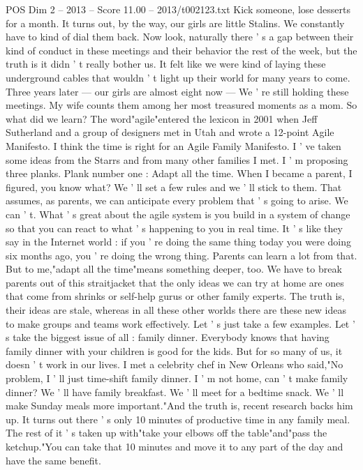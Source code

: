 \begin{textsample}{POS Dim 2 – 2013 – Score 11.00 – 2013/t002123.txt}
Kick someone, lose desserts for a month.
It turns out, by the way, our girls are little Stalins.
We constantly have to kind of dial them back.
Now look, naturally there ' s a gap between their kind of conduct in these meetings and their behavior the rest of the week, but the truth is it didn ' t really bother us.
It felt like we were kind of laying these underground cables that wouldn ' t light up their world for many years to come.
Three years later — our girls are almost eight now — We ' re still holding these meetings.
My wife counts them among her most treasured moments as a mom.
So what did we learn?
The word"agile"entered the lexicon in 2001 when Jeff Sutherland and a group of designers met in Utah and wrote a 12-point Agile Manifesto.
I think the time is right for an Agile Family Manifesto.
I ' ve taken some ideas from the Starrs and from many other families I met.
I ' m proposing three planks.
Plank number one : Adapt all the time.
When I became a parent, I figured, you know what?
We ' ll set a few rules and we ' ll stick to them.
That assumes, as parents, we can anticipate every problem that ' s going to arise.
We can ' t.
What ' s great about the agile system is you build in a system of change so that you can react to what ' s happening to you in real time.
It ' s like they say in the Internet world : if you ' re doing the same thing today you were doing six months ago, you ' re doing the wrong thing.
Parents can learn a lot from that.
But to me,"adapt all the time"means something deeper, too.
We have to break parents out of this straitjacket that the only ideas we can try at home are ones that come from shrinks or self-help gurus or other family experts.
The truth is, their ideas are stale, whereas in all these other worlds there are these new ideas to make groups and teams work effectively.
Let ' s just take a few examples.
Let ' s take the biggest issue of all : family dinner.
Everybody knows that having family dinner with your children is good for the kids.
But for so many of us, it doesn ' t work in our lives.
I met a celebrity chef in New Orleans who said,"No problem, I ' ll just time-shift family dinner.
I ' m not home, can ' t make family dinner?
We ' ll have family breakfast.
We ' ll meet for a bedtime snack.
We ' ll make Sunday meals more important."And the truth is, recent research backs him up.
It turns out there ' s only 10 minutes of productive time in any family meal.
The rest of it ' s taken up with"take your elbows off the table"and"pass the ketchup."You can take that 10 minutes and move it to any part of the day and have the same benefit.

\end{textsample}
